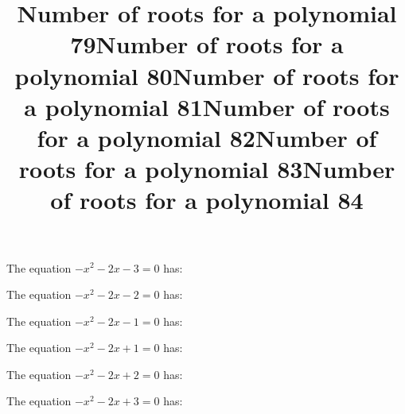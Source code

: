 \documentclass{article}
\begin{document}
\begin{category}
\begin{question}[multichoice]

\end{question}
\begin{question}[multichoice]
\title{Number of roots for a polynomial 79}
The equation $- x^{2} - 2 x - 3=0$ has:


\end{question}
\begin{question}[multichoice]
\title{Number of roots for a polynomial 80}
The equation $- x^{2} - 2 x - 2=0$ has:


\end{question}
\begin{question}[multichoice]
\title{Number of roots for a polynomial 81}
The equation $- x^{2} - 2 x - 1=0$ has:


\end{question}
\begin{question}[multichoice]
\title{Number of roots for a polynomial 82}
The equation $- x^{2} - 2 x + 1=0$ has:


\end{question}
\begin{question}[multichoice]
\title{Number of roots for a polynomial 83}
The equation $- x^{2} - 2 x + 2=0$ has:


\end{question}
\begin{question}[multichoice]
\title{Number of roots for a polynomial 84}
The equation $- x^{2} - 2 x + 3=0$ has:



\end{question}
\end{category}
\end{document}
